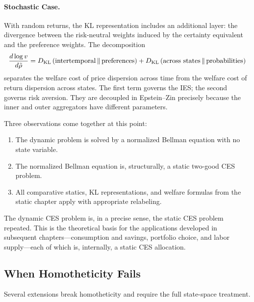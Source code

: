 \paragraph{Stochastic Case.}
With random returns, the KL representation includes an additional layer: the divergence between the risk-neutral weights induced by the certainty equivalent and the preference weights. The decomposition
\begin{equation}
\frac{d \log v}{d \tilde\rho} = D_{\mathrm{KL}}\left(\text{intertemporal} \,\|\, \text{preferences}\right) + D_{\mathrm{KL}}\left(\text{across states} \,\|\, \text{probabilities}\right)
\label{eq:kl-decomposition-dyn}
\end{equation}
separates the welfare cost of price dispersion across time from the welfare cost of return dispersion across states. The first term governs the IES; the second governs risk aversion. They are decoupled in Epstein--Zin precisely because the inner and outer aggregators have different parameters.

\begin{calloutimportant}[Unification]
Three observations come together at this point:
\begin{enumerate}[leftmargin=2em]
    \item The dynamic problem is solved by a normalized Bellman equation with no state variable.
    \item The normalized Bellman equation is, structurally, a static two-good CES problem.
    \item All comparative statics, KL representations, and welfare formulas from the static chapter apply with appropriate relabeling.
\end{enumerate}
The dynamic CES problem is, in a precise sense, the static CES problem repeated. This is the theoretical basis for the applications developed in subsequent chapters---consumption and savings, portfolio choice, and labor supply---each of which is, internally, a static CES allocation.
\end{calloutimportant}

\subsection{When Homotheticity Fails}
\label{subsec:dp-non-homothetic}

Several extensions break homotheticity and require the full state-space treatment.

